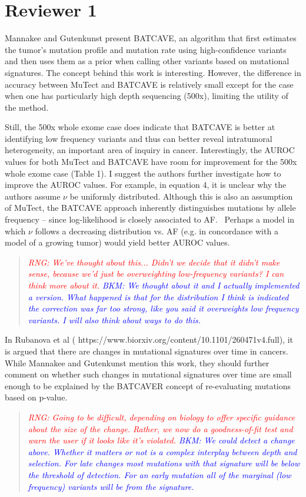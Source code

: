 \documentclass[11pt]{article}
\newcommand{\BKM}[1]{\textcolor{blue}{BKM: #1}}
\newcommand{\RNG}[1]{\textcolor{red}{RNG: #1}}
\newenvironment{response}
{\begin{quote}\itshape}
{\end{quote}}
\begin{document}
\section*{Reviewer 1}

Mannakee and Gutenkunst present BATCAVE, an algorithm that first estimates the tumor’s mutation profile and mutation rate using high-confidence variants and then uses them as a prior when calling other variants based on mutational signatures. The concept behind this work is interesting. However, the difference in accuracy between MuTect and BATCAVE is relatively small except for the case when one has particularly high depth sequencing (500x), limiting the utility of the method. 

Still, the 500x whole exome case does indicate that BATCAVE is better at identifying low frequency variants and thus can better reveal intratumoral heterogeneity, an important area of inquiry in cancer. Interestingly, the AUROC values for both MuTect and BATCAVE have room for improvement for the 500x whole exome case (Table 1). I suggest the authors further investigate how to improve the AUROC values. For example, in equation 4, it is unclear why the authors assume $\nu$ be uniformly distributed. Although this is also an assumption of MuTect, the BATCAVE approach inherently distinguishes mutations by allele frequency – since log-likelihood is closely associated to AF.  Perhaps a model in which $\nu$ follows a decreasing distribution vs. AF (e.g. in concordance with a model of a growing tumor) would yield better AUROC values.  
\begin{response}
\RNG{We've thought about this... Didn't we decide that it didn't make sense, because we'd just be overweighting low-frequency variants? I can think more about it.}
\BKM{We thought about it and I actually implemented a version. What happened is that for the distribution I think is indicated the correction was far too strong, like you said it overweights low frequency variants. I will also think about ways to do this.}
\end{response}

In Rubanova et al ( https://www.biorxiv.org/content/10.1101/260471v4.full), it is argued that there are changes in mutational signatures over time in cancers. While Mannakee and Gutenkunst mention this work, they should further comment on whether such changes in mutational signatures over time are small enough to be explained by the BATCAVER concept of re-evaluating mutations based on p-value.
\begin{response}
\RNG{Going to be difficult, depending on biology to offer specific guidance about the size of the change. Rather, we now do a goodness-of-fit test and warn the user if it looks like it's violated.}
\BKM{We could detect a change above. Whether it matters or not is a complex interplay between depth and selection. For late changes most mutations with that signature will be below the threshold of detection. For an early mutation all of the marginal (low frequency) variants will be from the signature.}
\end{response}
\end{document}
